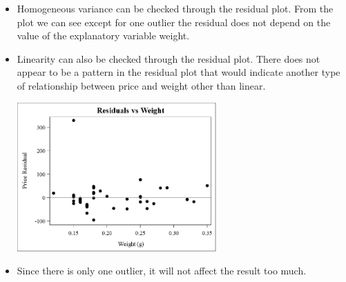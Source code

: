 \documentclass{article}
\begin{document}
\begin{enumerate}[leftmargin = 0 em, label = \arabic*., font = \bfseries]
\begin{itemize}
\item
Homogeneous variance can be checked through the residual plot. From the plot we can see except for one outlier the residual does not depend on the value of the explanatory variable
weight. 

\item
Linearity can also be checked through the residual plot. There
does not appear to be a pattern in the residual plot that would indicate another type of
relationship between price and weight other than linear.

\begin{center}
	\includegraphics[width = 0.6\textwidth]{res.png}
\end{center}

\item
Since there is only one outlier, it will not affect the result too much.
\end{itemize}



\end{enumerate}

	
\end{document}
